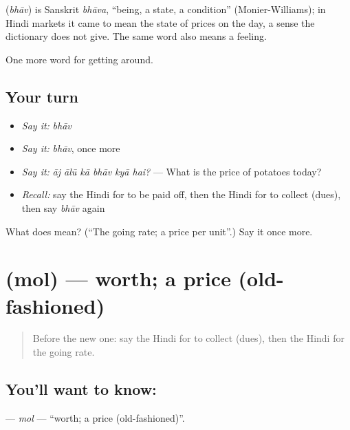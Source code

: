 \begin{cousinweb}
\textbf{} (\emph{bhāv}) is Sanskrit \emph{bhāva}, \textquotedblleft{}being, a state, a condition\textquotedblright{} (Monier-Williams); in Hindi markets it came to mean the state of prices on the day, a sense the dictionary does not give. The same word also means a feeling.
\end{cousinweb}

\begin{grammarlens}[title={What you've built}]
One more word for getting around.
\end{grammarlens}

\subsection*{Your turn}
\begin{itemize}
\raggedright
  \item \emph{Say it:} \emph{bhāv}
  \item \emph{Say it:} \emph{bhāv}, once more
  \item \emph{Say it:} \emph{āj ālū kā bhāv kyā hai?} — What is the price of potatoes today?
  \item \emph{Recall:} say the Hindi for to be paid off, then the Hindi for to collect (dues), then say \emph{bhāv} again
\end{itemize}

\begin{tcolorbox}[breakable,colback=teal!4,colframe=teal!35!black,title={Before you move on}]
What does  mean? (\textquotedblleft{}The going rate; a price per unit\textquotedblright{}.) Say it once more.
\end{tcolorbox}
\section[\texorpdfstring{\hi{मोल} (mol)}{मोल (mol)}]{ (mol) — worth; a price (old-fashioned)}

\label{lesson:HI-C431-mol}



\begin{quote}
Before the new one: say the Hindi for to collect (dues), then the Hindi for the going rate.
\end{quote}

\subsection*{You'll want to know: }
\textbf{} — \emph{mol} — \textquotedblleft{}worth; a price (old-fashioned)\textquotedblright{}.

